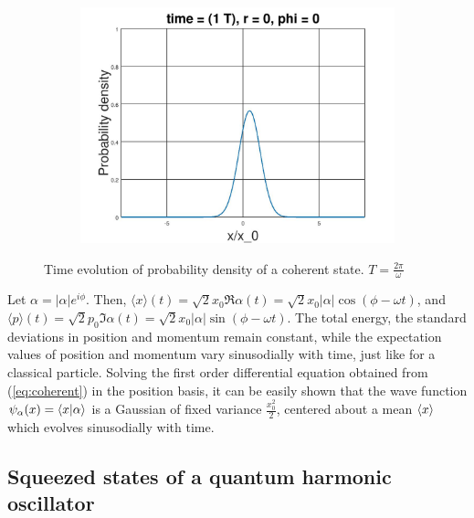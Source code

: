 \documentclass[12pt, twoside]{article}
\begin{document}
\begin{figure}[h!]
\begin{subfigure}[h!]{0.3\linewidth}
	\includegraphics[width=\linewidth]{graphs/coherent/8.jpg}
\end{subfigure}
	\caption{Time evolution of probability density of a coherent state. $T = \frac{2\pi}{\omega}$}
\end{figure}
Let $\alpha = |\alpha|e^{i\phi}$. Then, $\langle x \rangle (t) $$= \sqrt{2} x_0 \Re{\alpha(t)} $$= \sqrt{2} x_0 |\alpha| \cos(\phi-\omega t)$, and $ \langle p \rangle (t) $$= \sqrt{2} p_0 \Im{\alpha(t)} $$= \sqrt{2} x_0 |\alpha| \sin(\phi-\omega t)$. The total energy, the standard deviations in position and momentum remain constant, while the expectation values of position and momentum vary sinusodially with time, just like for a classical particle. Solving the first order differential equation obtained from (\ref{eq:coherent}) in the position basis, it can be easily shown that the wave function $\psi_\alpha (x) = \braket{x}{\alpha}$ is a Gaussian of fixed variance $\frac{x_0^2}{2}$, centered about a mean $\expval{x}$ which evolves sinusodially with time.
\subsection{Squeezed states of a quantum harmonic oscillator}
\end{document}
